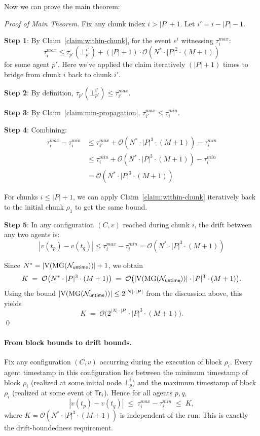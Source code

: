 Now we can prove the main theorem:

\begin{proof}[Proof of Main Theorem]
Fix any chunk index $i > |P| + 1$. Let $i' = i - |P| - 1$.

\textbf{Step 1}: By Claim~\ref{claim:within-chunk}, for the event $e^i$ witnessing $\tau^{max}_i$:
\[
\tau^{max}_i \leq \tau_{p'}(\bot^{i'}_{p'}) + (|P| + 1) \cdot \mathcal{O}(N^* \cdot |P|^2 \cdot (M+1))
\]
for some agent $p'$. Here we've applied the claim iteratively $(|P| + 1)$ times to bridge from chunk $i$ back to chunk $i'$.

\textbf{Step 2}: By definition, $\tau_{p'}(\bot^{i'}_{p'}) \leq \tau^{max}_{i'}$.

\textbf{Step 3}: By Claim~\ref{claim:min-propagation}, $\tau^{max}_{i'} \leq \tau^{min}_i$.

\textbf{Step 4}: Combining:
\begin{align*}
\tau^{max}_i - \tau^{min}_i &\leq \tau^{max}_{i'} + \mathcal{O}(N^* \cdot |P|^3 \cdot (M+1)) - \tau^{min}_i \\
&\leq \tau^{min}_i + \mathcal{O}(N^* \cdot |P|^3 \cdot (M+1)) - \tau^{min}_i \\
&= \mathcal{O}(N^* \cdot |P|^3 \cdot (M+1))
\end{align*}

For chunks $i \leq |P| + 1$, we can apply Claim~\ref{claim:within-chunk} iteratively back to the initial chunk $\rho_1$ to get the same bound.

\textbf{Step 5}: In any configuration $(C, v)$ reached during chunk $i$, the drift between any two agents is:
\[
|v(t_p) - v(t_q)| \leq \tau^{max}_i - \tau^{min}_i = \mathcal{O}(N^* \cdot |P|^3 \cdot (M+1))
\]

Since $N^* = |\mathrm{V}(\operatorname{MG}(\mathcal{N}_{\mathsf{untime}}))|+1$, we obtain
\[
K \;=\; \mathcal{O}\bigl(N^*\cdot |P|^3 \cdot (M+1)\bigr)
\;=\; \mathcal{O}\bigl(|\mathrm{V}(\operatorname{MG}(\mathcal{N}_{\mathsf{untime}}))|\cdot |P|^3 \cdot (M+1)\bigr).
\]
Using the bound $|\mathrm{V}(\operatorname{MG}(\mathcal{N}_{\mathsf{untime}}))|\le 2^{|N|\cdot|P|}$ from the discussion above, this yields
\[
K \;=\; \mathcal{O}\bigl(2^{|N|\cdot|P|}\cdot |P|^3 \cdot (M+1)\bigr).
\]
\qed
\end{proof}

\paragraph*{From block bounds to drift bounds.}
Fix any configuration $(C,v)$ occurring during the execution of block $\rho_i$. Every agent timestamp in this configuration lies between the minimum timestamp of block $\rho_i$ (realized at some initial node $\bot^i_p$) and the maximum timestamp of block $\rho_i$ (realized at some event of $\textsf{Tr}_i$). Hence for all agents $p,q$,
\[
    |v(t_p)-v(t_q)| \;\le\; \tau^{max}_i - \tau^{min}_i \;\le\; K,
\]
where $K = \mathcal{O}(N^* \cdot |P|^3 \cdot (M+1))$ is independent of the run. This is exactly the drift-boundedness requirement.

